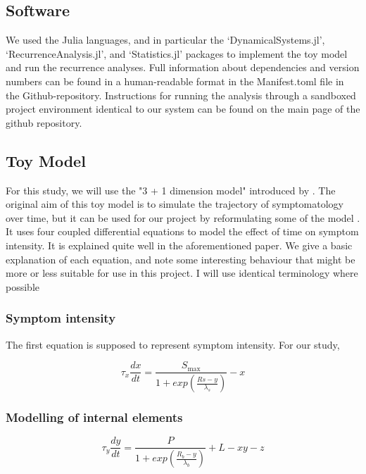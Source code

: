 \documentclass[utf8]{FrontiersinVancouver}
\begin{document}
\subsection{Software}
We used the Julia languages, and in particular the `DynamicalSystems.jl', `RecurrenceAnalysis.jl', and `Statistics.jl' packages to implement the toy model and run the recurrence analyses. Full information about dependencies and version numbers can be found in a human-readable format in the Manifest.toml file in the Github-repository. Instructions for running the analysis through a sandboxed project environment identical to our system can be found on the main page of the github repository.

\subsection{Toy Model}
For this study, we will use the "3 + 1 dimension model" introduced by \citep{gauldDynamicalSystemsComputational2023}. The original aim of this toy model is to simulate the trajectory of symptomatology over time, but it can be used for our project by reformulating some of the model .  It uses four coupled differential equations to model the effect of time on symptom intensity. It is explained quite well in the aforementioned paper. We give a basic explanation of each equation, and note some interesting behaviour that might be more or less suitable for use in this project. I will use identical terminology where possible


\subsubsection{Symptom intensity}
The first equation is supposed to represent symptom intensity. For our study, 

\begin{equation}
    \tau_{x}\frac{dx}{dt} = \frac{S_{\max}}{1+exp(\frac{Rs-y}{\lambda_{s}})} - x
\end{equation}


\subsubsection{Modelling of internal elements}

\begin{equation}
    \tau_{y}\frac{dy}{dt} = \frac{P}{1+exp(\frac{R_{b}-y}{\lambda_{b}})} + L - xy - z
\end{equation}
\end{document}
